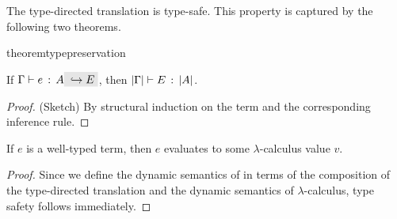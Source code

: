The type-directed translation is type-safe. This property is captured
by the following two theorems.

\begin{restatable}{theorem}{typepreservation}
  \label{theorem:type-preservation}

  If $ \jtype \Gamma e A \yields E $,
  then $ \lvert \Gamma \rvert \vdash E \ \!:\! \ \lvert A \rvert $.
\end{restatable}

\begin{proof}
  (Sketch) By structural induction on the term and the corresponding
  inference rule.
\end{proof}

\begin{theorem}
  If $e$ is a well-typed \name term, then $e$ evaluates to some $\lambda$-calculus
  value $v$.
\end{theorem}

\begin{proof}
  Since we define the dynamic semantics of \name in terms of the composition of
  the type-directed translation and the dynamic semantics of $\lambda$-calculus, type safety follows immediately.
\end{proof}
